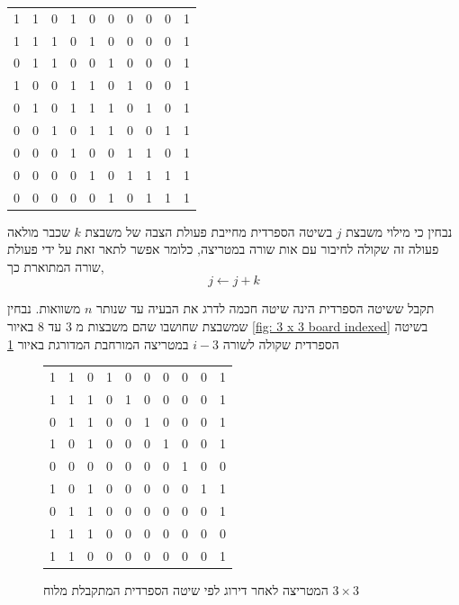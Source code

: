 \documentclass[12pt,leqno]{article}
\begin{document}
\begin{center}
    \begin{tabular}{|ccccccccc|c|}
        \hline
        1& 1& 0& 1& 0& 0& 0& 0& 0& 1 \\
        1& 1& 1& 0& 1& 0& 0& 0& 0& 1 \\
        0& 1& 1& 0& 0& 1& 0& 0& 0& 1 \\
        1& 0& 0& 1& 1& 0& 1& 0& 0& 1 \\
        0& 1& 0& 1& 1& 1& 0& 1& 0& 1 \\
        0& 0& 1& 0& 1& 1& 0& 0& 1& 1 \\
        0& 0& 0& 1& 0& 0& 1& 1& 0& 1 \\
        0& 0& 0& 0& 1& 0& 1& 1& 1& 1 \\
        0& 0& 0& 0& 0& 1& 0& 1& 1& 1 \\
        \hline
    \end{tabular}
\end{center}

נבחין כי מילוי משבצת 
$j$
בשיטה הספרדית מחייבת פעולת הצבה של משבצת
$k$
שכבר מולאה פעולה זה שקולה 
לחיבור עם אות שורה במטריצה, כלומר אפשר לתאר זאת על ידי פעולת שורה 
המתוארת כך,
\[ j \leftarrow j + k \]

תקבל ששיטה הספרדית הינה 
שיטה חכמה לדרג את הבעיה
עד שנותר 
$n$
משוואות.
נבחין שמשבצת שחושבו
שהם משבצות 
מ
$3$
עד 
$8$
באיור
\ref{fig: 3 x 3 board indexed}
בשיטה הספרדית
שקולה לשורה 
$i-3$
במטריצה המורחבת המדורגת
באיור
\ref{fig: matrix after spanish}

\begin{figure}
    \caption{המטריצה לאחר דירוג לפי שיטה הספרדית המתקבלת
        מלוח 
        $3 \times 3$}
    \label{fig: matrix after spanish}
    \begin{center}
        \begin{tabular}{|ccccccccc|c|}
            \hline
    1& 1& 0& 1& 0& 0& 0& 0& 0& 1 \\
    1& 1& 1& 0& 1& 0& 0& 0& 0& 1 \\
    0& 1& 1& 0& 0& 1& 0& 0& 0& 1 \\
    1& 0& 1& 0& 0& 0& 1& 0& 0& 1\\
    0& 0& 0& 0& 0& 0& 0& 1& 0& 0\\
    1& 0& 1& 0& 0& 0& 0& 0& 1& 1\\
    0& 1& 1& 0& 0& 0& 0& 0& 0& 1\\
    1& 1& 1& 0& 0& 0& 0& 0& 0& 0\\
    1& 1& 0& 0& 0& 0& 0& 0& 0& 1\\
            \hline
        \end{tabular}
    \end{center}
\end{figure}
\end{document}
